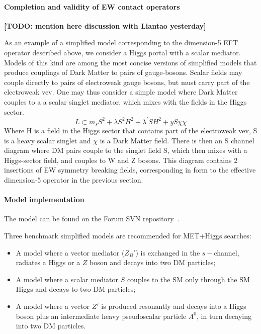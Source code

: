 \paragraph{Completion and validity of EW contact operators}

\textbf{[TODO: mention here discussion with Liantao yesterday]}


As an example of a simplified model corresponding to the dimension-5 EFT operator 
described above, we consider a Higgs portal with a scalar mediator. Models of this kind
are among the most concise versions of simplified models that produce 
couplings of Dark Matter to pairs of gauge-bosons.  Scalar fields may couple directly to pairs of electroweak gauge bosons, 
but must carry part of the electroweak vev.  One may thus consider a simple model where Dark Matter couples to a a scalar 
singlet mediator, which mixes with the fields in the Higgs sector.
\begin{equation}
L\subset m_s S^2 + \lambda S^2H^2 +\lambda^{'} S H^2 + y S \chi \overline{\chi}
\end{equation}
Where H is a field in the Higgs sector that contains part of the electroweak vev, 
S is a heavy scalar singlet and $\chi$ is a Dark Matter field. 
There is then an S channel diagram where DM pairs couple to the singlet field S, 
which then mixes with a Higgs-sector field, and couples to W and Z bosons. 
This diagram contains 2 insertions of EW symmetry breaking fields, 
corresponding in form to the effective dimension-5 operator in the previous section.   

\paragraph{Model implementation}

The model can be found on the Forum SVN repository~\cite{ForumSVN_monoHEFTD5}.


Three benchmark simplified models \cite{Carpenter:2013xra,Berlin:2014cfa} 
are recommended for MET+Higgs searches:
\begin{itemize}
	\item A model where a vector mediator ($Z_B'$) is exchanged in the $s-$channel, 
	radiates a Higgs or a $Z$ boson and decays into two DM particles;
	\item A model where a scalar mediator $S$ couples to the SM only 
	through the SM Higgs and decays to two DM particles;
	\item A model where a vector $Z'$ is produced resonantly and decays into a Higgs boson
	plus an intermediate heavy pseudoscalar particle $A^0$, in turn decaying into two DM particles. 
\end{itemize}

